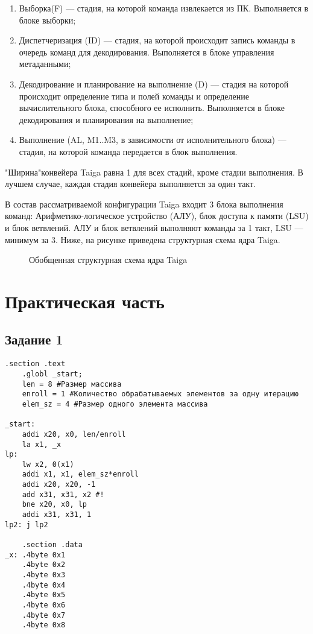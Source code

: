 \begin{enumerate}
	\item Выборка(F) — стадия, на которой команда извлекается из ПК. Выполняется в блоке выборки;
	\item Диспетчеризация (ID) — стадия, на которой происходит запись команды в очередь команд для декодирования. Выполняется в блоке управления метаданными;
	\item Декодирование и планирование на выполнение (D) — стадия на которой происходит определение типа и полей команды и определение вычислительного блока, способного ее исполнить. Выполняется в блоке декодирования и планирования на выполнение;
	\item Выполнение (AL, M1..M3, в зависимости от исполнительного блока) — стадия, на которой команда передается в блок выполнения.
\end{enumerate}
"Ширина"конвейера Taiga равна 1 для всех стадий, кроме стадии выполнения. В лучшем случае, каждая стадия конвейера выполняется за один такт. 

В состав рассматриваемой конфигурации Taiga входит 3 блока выполнения команд: Арифметико-логическое устройство (АЛУ), блок доступа к памяти (LSU) и блок ветвлений. АЛУ и блок ветвлений выполняют команды за 1 такт, LSU — минимум за 3. Ниже, на рисунке приведена структурная схема ядра Taiga.

\begin{figure}[ph!]
	\caption{Обобщенная структурная схема ядра Taiga}
\end{figure}

\chapter{Практическая часть}

\section{Задание 1}

\begin{lstlisting}[label=some-code-1,caption=Листинг исходной программы]
    .section .text
    .globl _start;
    len = 8 #Размер массива
    enroll = 1 #Количество обрабатываемых элементов за одну итерацию
    elem_sz = 4 #Размер одного элемента массива

_start:
    addi x20, x0, len/enroll
    la x1, _x
lp:
    lw x2, 0(x1)
    addi x1, x1, elem_sz*enroll
    addi x20, x20, -1
    add x31, x31, x2 #!
    bne x20, x0, lp
    addi x31, x31, 1
lp2: j lp2

    .section .data
_x: .4byte 0x1
    .4byte 0x2
    .4byte 0x3
    .4byte 0x4
    .4byte 0x5
    .4byte 0x6
    .4byte 0x7
    .4byte 0x8
\end{lstlisting}

